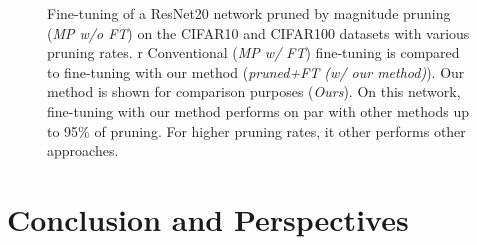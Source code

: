 \begin{figure}
\centering
{}
  \caption{ Fine-tuning of a ResNet20 network pruned by magnitude
  pruning (\emph{MP w/o FT}) on the CIFAR10 and CIFAR100 datasets with various
  pruning rates. r  Conventional (\emph{MP w/ FT}) fine-tuning is compared to
  fine-tuning with our method (\emph{pruned+FT (w/ our method)}). Our method is
  shown for comparison purposes (\emph{Ours}). On this network, fine-tuning with
  our method performs on par with other methods up to 95\% of pruning. For
  higher pruning rates, it other performs other approaches.}
    \label{fig:chap1:finetuning_impact_vgg6}
\end{figure}



\section{Conclusion and Perspectives}
